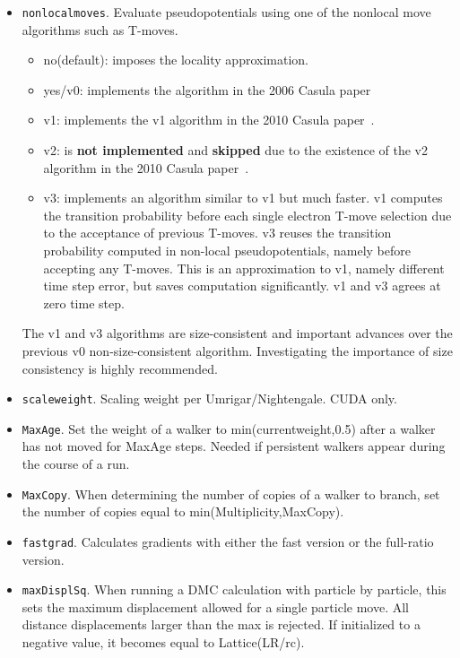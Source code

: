 \begin{itemize}
\item \texttt{nonlocalmoves}. Evaluate pseudopotentials using one of the nonlocal move algorithms such as T-moves.
\begin{itemize}
\item no(default): imposes the locality approximation.
\item yes/v0: implements the algorithm in the 2006 Casula paper~\cite{Casula2006}
\item v1: implements the v1 algorithm in the 2010 Casula paper~\cite{Casula2010}.
\item v2: is \textbf{not implemented} and \textbf{skipped} due to the existence of the v2 algorithm in the 2010 Casula paper~\cite{Casula2010}.
\item v3: implements an algorithm similar to v1 but much faster. v1 computes the transition probability before each single electron T-move selection due to the acceptance of previous T-moves. v3 reuses the transition probability computed in non-local pseudopotentials, namely before accepting any T-moves. This is an approximation to v1, namely different time step error, but saves computation significantly. v1 and v3 agrees at zero time step.
\end{itemize}
The v1 and v3 algorithms are size-consistent and important advances over the previous v0 non-size-consistent algorithm. Investigating the importance of size consistency is highly recommended.

\item \texttt{scaleweight}. Scaling weight per Umrigar/Nightengale.  CUDA only.

\item \texttt{MaxAge}. Set the weight of a walker to min(currentweight,0.5) after a walker has not moved for MaxAge steps.  Needed if persistent walkers appear during the course of a run.

\item \texttt{MaxCopy}. When determining the number of copies of a walker to branch, set the number of copies equal to min(Multiplicity,MaxCopy).

\item \texttt{fastgrad}. Calculates gradients with either the fast version or the full-ratio version.

\item \texttt{maxDisplSq}.  When running a DMC calculation with particle by particle, this sets the maximum displacement allowed for a single particle move.  All distance displacements larger than the max is rejected.  If initialized to a negative value, it becomes equal to Lattice(LR/rc).


\end{itemize}
